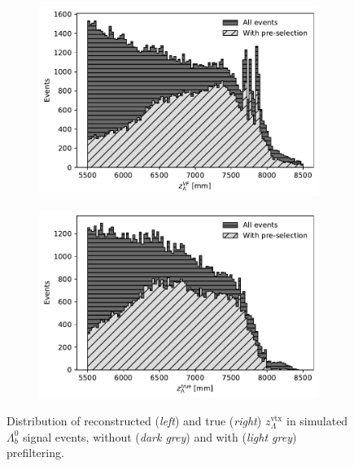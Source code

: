 \begin{figure}[t]
	\centering
	\begin{subfigure}{.45\textwidth}
		\includegraphics[width=\textwidth]{graphics/04-event_selection/Lambda_endvertex_z.pdf}
		\caption{}
	\end{subfigure}
	\begin{subfigure}{.45\textwidth}
		\includegraphics[width=\textwidth]{graphics/04-event_selection/Lambda_endvertex_z_true.pdf}
		\caption{}
	\end{subfigure}
	\caption[Distribution of reconstructed and true $z_\Lambda^\text{vtx}$ in simulated $\Lambda_b^0$ signal events.]{Distribution of reconstructed (\textit{left}) and true (\textit{right}) $z_\Lambda^\text{vtx}$ in simulated $\Lambda_b^0$ signal events, without (\textit{dark grey}) and with (\textit{light grey}) prefiltering.}
\end{figure}

